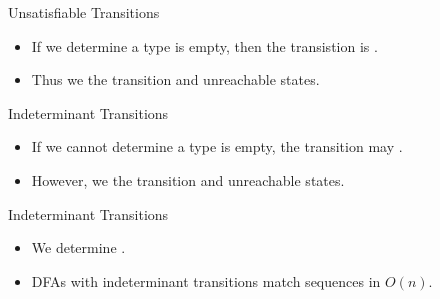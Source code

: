 



\newsavebox\classbox
\begin{lrbox}{\classbox}
  \begin{minipage}{5cm}
    
  \end{minipage}
\end{lrbox}

\begin{frame}{Unsatisfiable Transitions}

  \scalebox{0.8}{}
  \begin{itemize}
  \item   If we determine a type is empty, then the transistion is .
  \item Thus we  the transition and unreachable states.

  \end{itemize}
\end{frame}

\begin{frame}{Indeterminant Transitions}

  \scalebox{0.8}{}

  \begin{itemize}
  \item   If we cannot determine a type is empty, the transition may
    . 
  \item  However, we     the transition and unreachable states.
  \end{itemize}
\end{frame}


\begin{frame}{Indeterminant Transitions}

  \scalebox{0.8}{}

  \begin{itemize}
    \item We  determine .
    \item DFAs with indeterminant transitions 
      match sequences in $O(n)$.
  \end{itemize}
\end{frame}


